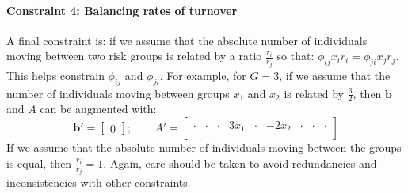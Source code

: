\paragraph{Constraint 4: Balancing rates of turnover}
A final constraint is:
if we assume that
the absolute number of individuals moving between two risk groups is
related by a ratio $\frac{r_i}{r_j}$ so that:
$\phi_{ij} x_{i} r_{i} = \phi_{ji} x_{j} r_{j}$.
This helps constrain $\phi_{ij}$ and $\phi_{ji}$.
For example, for $G = 3$,
if we assume that the number of individuals moving between groups $x_1$ and $x_2$
is related by $\frac{3}{2}$,
then $\bm{b}$ and $A$ can be augmented with:
\begin{equation}
\bm{b}' = \left[\begin{array}{c}
0
\end{array}\right];\qquad
A' = \left[\begin{array}{ccccccccc}
\cdot & \cdot & \cdot & 3 x_1 & \cdot & -2 x_2 & \cdot & \cdot & \cdot \\
\end{array}\right] 
\end{equation}
If we assume that the absolute number of individuals moving between the groups is equal,
then $\frac{r_i}{r_j} = 1$.
Again, care should be taken to avoid redundancies and inconsistencies with other constraints.
